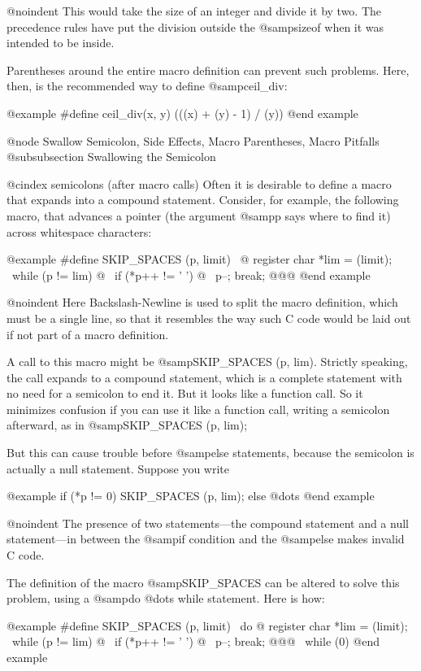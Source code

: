 {{@noindent
This would take the size of an integer and divide it by two.  The precedence
rules have put the division outside the @samp{sizeof} when it was intended
to be inside.

Parentheses around the entire macro definition can prevent such problems.
Here, then, is the recommended way to define @samp{ceil_div}:

@example
#define ceil_div(x, y) (((x) + (y) - 1) / (y))
@end example

@node Swallow Semicolon, Side Effects, Macro Parentheses, Macro Pitfalls
@subsubsection Swallowing the Semicolon

@cindex semicolons (after macro calls)
Often it is desirable to define a macro that expands into a compound
statement.  Consider, for example, the following macro, that advances a
pointer (the argument @samp{p} says where to find it) across whitespace
characters:

@example
#define SKIP_SPACES (p, limit)  \
@{ register char *lim = (limit); \
  while (p != lim) @{            \
    if (*p++ != ' ') @{          \
      p--; break; @}@}@}
@end example

@noindent
Here Backslash-Newline is used to split the macro definition, which must
be a single line, so that it resembles the way such C code would be
laid out if not part of a macro definition.

A call to this macro might be @samp{SKIP_SPACES (p, lim)}.  Strictly
speaking, the call expands to a compound statement, which is a complete
statement with no need for a semicolon to end it.  But it looks like a
function call.  So it minimizes confusion if you can use it like a function
call, writing a semicolon afterward, as in @samp{SKIP_SPACES (p, lim);}

But this can cause trouble before @samp{else} statements, because the
semicolon is actually a null statement.  Suppose you write

@example
if (*p != 0)
  SKIP_SPACES (p, lim);
else @dots{}
@end example

@noindent
The presence of two statements---the compound statement and a null
statement---in between the @samp{if} condition and the @samp{else}
makes invalid C code.

The definition of the macro @samp{SKIP_SPACES} can be altered to solve
this problem, using a @samp{do @dots{} while} statement.  Here is how:

@example
#define SKIP_SPACES (p, limit)     \
do @{ register char *lim = (limit); \
     while (p != lim) @{            \
       if (*p++ != ' ') @{          \
         p--; break; @}@}@}           \
while (0)
@end example

}}
